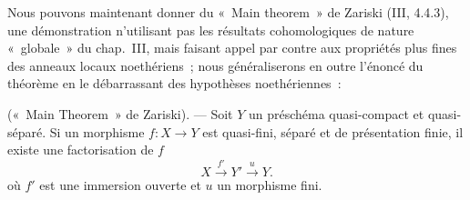 \begin{env}[8.12.5]
\label{IV.8.12.5-fr}
Nous pouvons maintenant donner du «~Main theorem~» de Zariski (III, 4.4.3),
une démonstration n'utilisant pas les résultats cohomologiques de nature
«~globale~» du chap.~III, mais faisant appel par contre aux propriétés plus
fines des anneaux locaux noethériens~; nous généraliserons en outre l'énoncé
du théorème en le débarrassant des hypothèses noethériennes~:
\end{env}

\begin{theorem}[8.12.6]
\label{IV.8.12.6-fr}
(«~Main Theorem~» de Zariski). --- Soit $Y$ un préschéma quasi-compact et
quasi-séparé. Si un morphisme $f:X\to Y$ est quasi-fini, séparé et de
présentation finie, il existe une factorisation de $f$
\begin{equation}
\label{IV.8.12.6.1-fr}
X\xrightarrow{f'}Y'\xrightarrow{u}Y. \tag{8.12.6.1}
\end{equation}
où $f'$ est une immersion ouverte et $u$ un morphisme fini.
\end{theorem}

